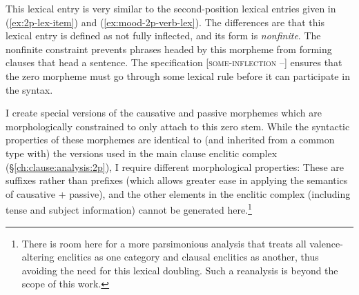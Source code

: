 \begin{singlespacing}
\ex \label{ex:svc-zero-morpheme}
\xe
\end{singlespacing}

This lexical entry is very similar to the second-position lexical entries given in (\ref{ex:2p-lex-item}) and (\ref{ex:mood-2p-verb-lex}). The differences are that this lexical entry is defined as not fully inflected, and its form is \textit{nonfinite}. The nonfinite constraint prevents phrases headed by this morpheme from forming clauses that head a sentence. The specification [\textsc{some-inflection} --] ensures that the zero morpheme must go through some lexical rule before it can participate in the syntax.

I create special versions of the causative and passive morphemes which are morphologically constrained to only attach to this zero stem. While the syntactic properties of these morphemes are identical to (and inherited from a common type with) the versions used in the main clause enclitic complex (\S\ref{ch:clause:analysis:2p}), I require different morphological properties: These are suffixes rather than prefixes (which allows greater ease in applying the semantics of causative + passive), and the other elements in the enclitic complex (including tense and subject information) cannot be generated here.\footnote{There is room here for a more parsimonious analysis that treats all valence-altering enclitics as one category and clausal enclitics as another, thus avoiding the need for this lexical doubling. Such a reanalysis is beyond the scope of this work.}


